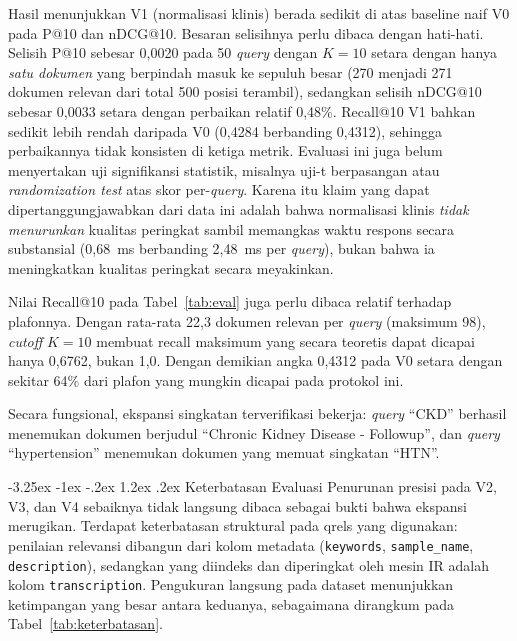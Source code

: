 \documentclass[a4paper,12pt]{article}
\makeatletter
\renewcommand{\subsection}{\@startsection{subsection}{2}{\z@}%
  {-3.25ex \@plus -1ex \@minus -.2ex}%
  {1.2ex \@plus .2ex}%
  {\normalfont\normalsize\bfseries}}
\makeatother
\begin{document}
Hasil menunjukkan V1 (normalisasi klinis) berada sedikit di atas baseline naif V0 pada P@10 dan nDCG@10. Besaran selisihnya perlu dibaca dengan hati-hati. Selisih P@10 sebesar 0,0020 pada 50 \textit{query} dengan $K = 10$ setara dengan hanya \emph{satu dokumen} yang berpindah masuk ke sepuluh besar (270 menjadi 271 dokumen relevan dari total 500 posisi terambil), sedangkan selisih nDCG@10 sebesar 0,0033 setara dengan perbaikan relatif 0,48\%. Recall@10 V1 bahkan sedikit lebih rendah daripada V0 (0,4284 berbanding 0,4312), sehingga perbaikannya tidak konsisten di ketiga metrik. Evaluasi ini juga belum menyertakan uji signifikansi statistik, misalnya uji-t berpasangan atau \textit{randomization test} atas skor per-\textit{query}. Karena itu klaim yang dapat dipertanggungjawabkan dari data ini adalah bahwa normalisasi klinis \emph{tidak menurunkan} kualitas peringkat sambil memangkas waktu respons secara substansial (0,68~ms berbanding 2,48~ms per \textit{query}), bukan bahwa ia meningkatkan kualitas peringkat secara meyakinkan.

Nilai Recall@10 pada Tabel~\ref{tab:eval} juga perlu dibaca relatif terhadap plafonnya. Dengan rata-rata 22,3 dokumen relevan per \textit{query} (maksimum 98), \textit{cutoff} $K = 10$ membuat recall maksimum yang secara teoretis dapat dicapai hanya 0,6762, bukan 1,0. Dengan demikian angka 0,4312 pada V0 setara dengan sekitar 64\% dari plafon yang mungkin dicapai pada protokol ini.

Secara fungsional, ekspansi singkatan terverifikasi bekerja: \textit{query} ``CKD'' berhasil menemukan dokumen berjudul ``Chronic Kidney Disease - Followup'', dan \textit{query} ``hypertension'' menemukan dokumen yang memuat singkatan ``HTN''.

\subsection{Keterbatasan Evaluasi}
\label{sub:keterbatasan}
Penurunan presisi pada V2, V3, dan V4 sebaiknya tidak langsung dibaca sebagai bukti bahwa ekspansi merugikan. Terdapat keterbatasan struktural pada qrels yang digunakan: penilaian relevansi dibangun dari kolom metadata (\texttt{keywords}, \texttt{sample\_name}, \texttt{description}), sedangkan yang diindeks dan diperingkat oleh mesin IR adalah kolom \texttt{transcription}. Pengukuran langsung pada dataset menunjukkan ketimpangan yang besar antara keduanya, sebagaimana dirangkum pada Tabel~\ref{tab:keterbatasan}.
\end{document}
